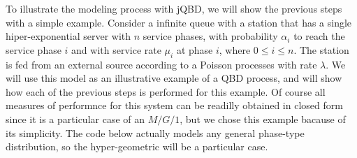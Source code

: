 \documentclass[11pt,letterpaper]{article}
\begin{document}
To illustrate the modeling process with jQBD, we will show the previous steps
with a simple example.  Consider a infinite queue with a station that has a
single hiper-expo\-nen\-tial server with $n$ service phases, with probability
$\alpha_i$ to reach the service phase $i$ and with service rate $\mu_i$ at phase
$i$, where $0\leq i \leq n$. The station is fed from an external source
according to a Poisson processes with rate $\lambda$.  We will use this model as
an illustrative example of a QBD process, and will show how each of the previous
steps is performed for this example. Of course all measures of performnce for
this system can be readilly obtained in closed form since it is a particular
case of an $M/G/1$, but we chose this example bacause of its simplicity. The
code below actually models any general phase-type distribution, so the
hyper-geometric will be a particular case.
\end{document}
